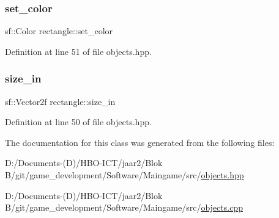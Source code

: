 \subsubsection{\texorpdfstring{set\+\_\+color}{set\_color}}
{\footnotesize\ttfamily sf\+::\+Color rectangle\+::set\+\_\+color\hspace{0.3cm}{\ttfamily [private]}}



Definition at line 51 of file objects.\+hpp.

\mbox{\label{classrectangle_ae2c7b7085f2e7778bc97cec8816360aa}} 
\subsubsection{\texorpdfstring{size\+\_\+in}{size\_in}}
{\footnotesize\ttfamily sf\+::\+Vector2f rectangle\+::size\+\_\+in\hspace{0.3cm}{\ttfamily [private]}}



Definition at line 50 of file objects.\+hpp.



The documentation for this class was generated from the following files\+:\begin{DoxyCompactItemize}
\item 
D\+:/\+Documents-\/(\+D)/\+H\+B\+O-\/\+I\+C\+T/jaar2/\+Blok B/git/game\+\_\+development/\+Software/\+Maingame/src/\hyperlink{objects_8hpp}{objects.\+hpp}\item 
D\+:/\+Documents-\/(\+D)/\+H\+B\+O-\/\+I\+C\+T/jaar2/\+Blok B/git/game\+\_\+development/\+Software/\+Maingame/src/\hyperlink{objects_8cpp}{objects.\+cpp}\end{DoxyCompactItemize}
